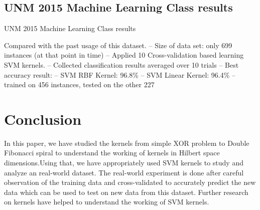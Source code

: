 \documentclass[conference]{IEEEtran}
\begin{document}
\subsection*{UNM 2015 Machine Learning Class results}
\begin{table}[h!]
\center
	\caption{UNM 2015 Machine Learning Class results}
\label{table:My_Results}
 Compared with the past usage of this dataset.
	  -- Size of data set: only 699 instances (at that point in time)
      -- Applied 10 Cross-validation based learning SVM kernels.
      -- Collected classification results averaged over 10 trials
      -- Best accuracy result: 
         -- SVM RBF Kernel: 96.8\%
         -- SVM Linear Kernel: 96.4\%
         -- trained on 456 instances, tested on the other 227
\end{table}

\section{Conclusion}
In this paper, we have studied the kernels from simple XOR problem to Double Fibonacci spiral to understand the working of kernels in Hilbert space dimensions.Using that, we have appropriately used SVM kernels to study and analyze an real-world dataset. The real-world experiment is done after careful observation of the training data and cross-validated to accurately predict the new data which can be used to test on new data from this dataset. Further research on kernels have helped to understand the working of SVM kernels.
%
%
\end{document}
